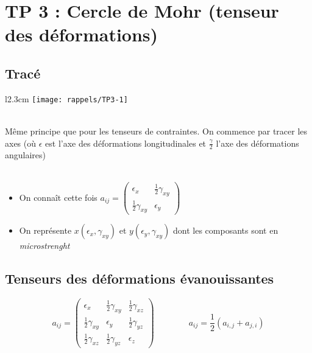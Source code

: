 \section*{TP 3 : Cercle de Mohr (tenseur des déformations)}
\subsection*{Tracé}

\begin{wrapfigure}[4]{l}{2.3cm}
\texttt{[image: rappels/TP3-1]}
\end{wrapfigure}	
	\ \\ Même principe que pour les tenseurs de contraintes. On commence par tracer les axes (où $\epsilon$ est l'axe des déformations longitudinales et $\frac{\gamma}{2}$ l'axe des déformations angulaires)\\\\

\begin{itemize}	
	\item On connaît cette fois $a_{ij} = 
	\left(	
	\begin{array}{cc}
	\epsilon _x & \frac{1}{2}\gamma _{xy} \\ 
	\frac{1}{2}\gamma _{xy} & \epsilon _y
	\end{array}
	\right) $
	
	\item On représente $x(\epsilon _x,\gamma _{xy})$ et $y(\epsilon _y ,\gamma _{xy})$ dont les composants sont en \textit{microstrenght}
\end{itemize}

\subsection*{Tenseurs des déformations évanouissantes}
\begin{equation}
a_ {ij} = 
\left(
\begin{array}{ccc}
\epsilon _x & \frac{1}{2}\gamma _{xy} & \frac{1}{2}\gamma _{xz} \\ 
\frac{1}{2}\gamma _{xy} & \epsilon _y & \frac{1}{2}\gamma _{yz} \\ 
\frac{1}{2}\gamma _{xz} & \frac{1}{2}\gamma _{yz} & \epsilon _z
\end{array} 
\right)
\qquad \qquad
a_{ij} = \frac{1}{2}(a_{i,j} + a_{j,i})
\end{equation}

